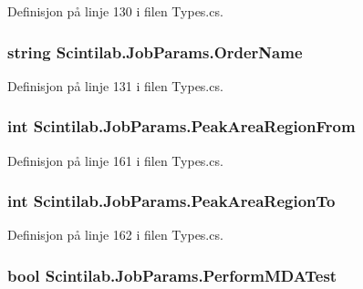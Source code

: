 Definisjon på linje 130 i filen Types.\+cs.

\hypertarget{class_scintilab_1_1_job_params_a191d91bcd772299d4a8db4e4f362356e}{
\subsubsection[{Order\+Name}]{\setlength{\rightskip}{0pt plus 5cm}string Scintilab.\+Job\+Params.\+Order\+Name}}\label{class_scintilab_1_1_job_params_a191d91bcd772299d4a8db4e4f362356e}


Definisjon på linje 131 i filen Types.\+cs.

\hypertarget{class_scintilab_1_1_job_params_af2d6aea23fbd17166ef2699b07cc1197}{
\subsubsection[{Peak\+Area\+Region\+From}]{\setlength{\rightskip}{0pt plus 5cm}int Scintilab.\+Job\+Params.\+Peak\+Area\+Region\+From}}\label{class_scintilab_1_1_job_params_af2d6aea23fbd17166ef2699b07cc1197}


Definisjon på linje 161 i filen Types.\+cs.

\hypertarget{class_scintilab_1_1_job_params_a6e41425ec29431a5d1eaaace63b12582}{
\subsubsection[{Peak\+Area\+Region\+To}]{\setlength{\rightskip}{0pt plus 5cm}int Scintilab.\+Job\+Params.\+Peak\+Area\+Region\+To}}\label{class_scintilab_1_1_job_params_a6e41425ec29431a5d1eaaace63b12582}


Definisjon på linje 162 i filen Types.\+cs.

\hypertarget{class_scintilab_1_1_job_params_af88d8af35608c73df1ac871a77f5a03b}{
\subsubsection[{Perform\+M\+D\+A\+Test}]{\setlength{\rightskip}{0pt plus 5cm}bool Scintilab.\+Job\+Params.\+Perform\+M\+D\+A\+Test}}\label{class_scintilab_1_1_job_params_af88d8af35608c73df1ac871a77f5a03b}


